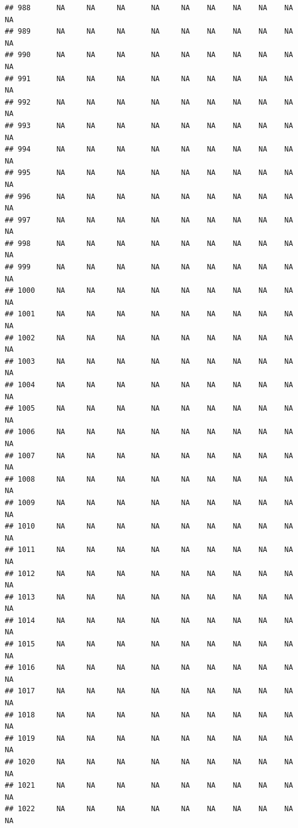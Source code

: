 \documentclass{article}\usepackage{graphicx, color}
\makeatletter
\newenvironment{kframe}{%
 \def\at@end@of@kframe{}%
 \ifinner\ifhmode%
  \def\at@end@of@kframe{\end{minipage}}%
  \begin{minipage}{\columnwidth}%
 \fi\fi%
 \def\FrameCommand##1{\hskip\@totalleftmargin \hskip-\fboxsep
 \colorbox{shadecolor}{##1}\hskip-\fboxsep
     \hskip-\linewidth \hskip-\@totalleftmargin \hskip\columnwidth}%
 \MakeFramed {\advance\hsize-\width
   \@totalleftmargin\z@ \linewidth\hsize
   \@setminipage}}%
 {\par\unskip\endMakeFramed%
 \at@end@of@kframe}
\newenvironment{knitrout}{}{} %
\makeatother
\begin{document}
\begin{knitrout}
\begin{kframe}
\begin{verbatim}
## 988      NA     NA     NA      NA     NA    NA    NA    NA    NA     NA
## 989      NA     NA     NA      NA     NA    NA    NA    NA    NA     NA
## 990      NA     NA     NA      NA     NA    NA    NA    NA    NA     NA
## 991      NA     NA     NA      NA     NA    NA    NA    NA    NA     NA
## 992      NA     NA     NA      NA     NA    NA    NA    NA    NA     NA
## 993      NA     NA     NA      NA     NA    NA    NA    NA    NA     NA
## 994      NA     NA     NA      NA     NA    NA    NA    NA    NA     NA
## 995      NA     NA     NA      NA     NA    NA    NA    NA    NA     NA
## 996      NA     NA     NA      NA     NA    NA    NA    NA    NA     NA
## 997      NA     NA     NA      NA     NA    NA    NA    NA    NA     NA
## 998      NA     NA     NA      NA     NA    NA    NA    NA    NA     NA
## 999      NA     NA     NA      NA     NA    NA    NA    NA    NA     NA
## 1000     NA     NA     NA      NA     NA    NA    NA    NA    NA     NA
## 1001     NA     NA     NA      NA     NA    NA    NA    NA    NA     NA
## 1002     NA     NA     NA      NA     NA    NA    NA    NA    NA     NA
## 1003     NA     NA     NA      NA     NA    NA    NA    NA    NA     NA
## 1004     NA     NA     NA      NA     NA    NA    NA    NA    NA     NA
## 1005     NA     NA     NA      NA     NA    NA    NA    NA    NA     NA
## 1006     NA     NA     NA      NA     NA    NA    NA    NA    NA     NA
## 1007     NA     NA     NA      NA     NA    NA    NA    NA    NA     NA
## 1008     NA     NA     NA      NA     NA    NA    NA    NA    NA     NA
## 1009     NA     NA     NA      NA     NA    NA    NA    NA    NA     NA
## 1010     NA     NA     NA      NA     NA    NA    NA    NA    NA     NA
## 1011     NA     NA     NA      NA     NA    NA    NA    NA    NA     NA
## 1012     NA     NA     NA      NA     NA    NA    NA    NA    NA     NA
## 1013     NA     NA     NA      NA     NA    NA    NA    NA    NA     NA
## 1014     NA     NA     NA      NA     NA    NA    NA    NA    NA     NA
## 1015     NA     NA     NA      NA     NA    NA    NA    NA    NA     NA
## 1016     NA     NA     NA      NA     NA    NA    NA    NA    NA     NA
## 1017     NA     NA     NA      NA     NA    NA    NA    NA    NA     NA
## 1018     NA     NA     NA      NA     NA    NA    NA    NA    NA     NA
## 1019     NA     NA     NA      NA     NA    NA    NA    NA    NA     NA
## 1020     NA     NA     NA      NA     NA    NA    NA    NA    NA     NA
## 1021     NA     NA     NA      NA     NA    NA    NA    NA    NA     NA
## 1022     NA     NA     NA      NA     NA    NA    NA    NA    NA     NA

\end{verbatim}
\end{kframe}
\end{knitrout}
\end{document}
